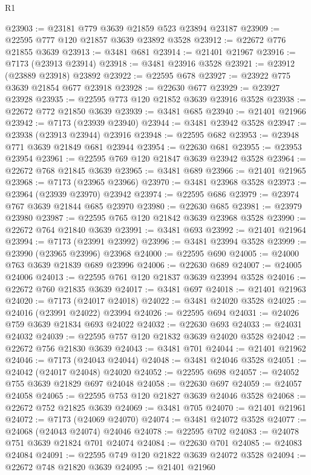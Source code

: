\begin{lexlean}{R1}
\begin{coremodule}
@23903 := @23181 @779 @3639 @21859 @523 @23894 @23187
@23909 := @22595 @777 @120 @21857 @3639 @23892 @3528
@23912 := @22672 @776 @21855 @3639
@23913 := @3481 @681
@23914 := @21401 @21967
@23916 := @7173 (@23913 @23914)
@23918 := @3481 @23916 @3528
@23921 := @23912 (@23889 @23918) @23892
@23922 := @22595 @678
@23927 := @23922 @775 @3639 @21854 @677 @23918
@23928 := @22630 @677
@23929 := @23927 @23928
@23935 := @22595 @773 @120 @21852 @3639 @23916 @3528
@23938 := @22672 @772 @21850 @3639
@23939 := @3481 @685
@23940 := @21401 @21966
@23942 := @7173 (@23939 @23940)
@23944 := @3481 @23942 @3528
@23947 := @23938 (@23913 @23944) @23916
@23948 := @22595 @682
@23953 := @23948 @771 @3639 @21849 @681 @23944
@23954 := @22630 @681
@23955 := @23953 @23954
@23961 := @22595 @769 @120 @21847 @3639 @23942 @3528
@23964 := @22672 @768 @21845 @3639
@23965 := @3481 @689
@23966 := @21401 @21965
@23968 := @7173 (@23965 @23966)
@23970 := @3481 @23968 @3528
@23973 := @23964 (@23939 @23970) @23942
@23974 := @22595 @686
@23979 := @23974 @767 @3639 @21844 @685 @23970
@23980 := @22630 @685
@23981 := @23979 @23980
@23987 := @22595 @765 @120 @21842 @3639 @23968 @3528
@23990 := @22672 @764 @21840 @3639
@23991 := @3481 @693
@23992 := @21401 @21964
@23994 := @7173 (@23991 @23992)
@23996 := @3481 @23994 @3528
@23999 := @23990 (@23965 @23996) @23968
@24000 := @22595 @690
@24005 := @24000 @763 @3639 @21839 @689 @23996
@24006 := @22630 @689
@24007 := @24005 @24006
@24013 := @22595 @761 @120 @21837 @3639 @23994 @3528
@24016 := @22672 @760 @21835 @3639
@24017 := @3481 @697
@24018 := @21401 @21963
@24020 := @7173 (@24017 @24018)
@24022 := @3481 @24020 @3528
@24025 := @24016 (@23991 @24022) @23994
@24026 := @22595 @694
@24031 := @24026 @759 @3639 @21834 @693 @24022
@24032 := @22630 @693
@24033 := @24031 @24032
@24039 := @22595 @757 @120 @21832 @3639 @24020 @3528
@24042 := @22672 @756 @21830 @3639
@24043 := @3481 @701
@24044 := @21401 @21962
@24046 := @7173 (@24043 @24044)
@24048 := @3481 @24046 @3528
@24051 := @24042 (@24017 @24048) @24020
@24052 := @22595 @698
@24057 := @24052 @755 @3639 @21829 @697 @24048
@24058 := @22630 @697
@24059 := @24057 @24058
@24065 := @22595 @753 @120 @21827 @3639 @24046 @3528
@24068 := @22672 @752 @21825 @3639
@24069 := @3481 @705
@24070 := @21401 @21961
@24072 := @7173 (@24069 @24070)
@24074 := @3481 @24072 @3528
@24077 := @24068 (@24043 @24074) @24046
@24078 := @22595 @702
@24083 := @24078 @751 @3639 @21824 @701 @24074
@24084 := @22630 @701
@24085 := @24083 @24084
@24091 := @22595 @749 @120 @21822 @3639 @24072 @3528
@24094 := @22672 @748 @21820 @3639
@24095 := @21401 @21960

\end{coremodule}
\end{lexlean}
